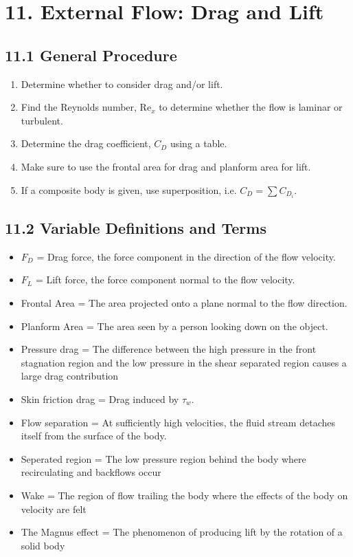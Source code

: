 \section*{11. External Flow: Drag and Lift}
\subsection*{11.1 General Procedure}
\begin{enumerate}
    \item Determine whether to consider drag and/or lift.
    \item Find the Reynolds number, Re$_x$ to determine whether the flow is laminar or turbulent.
    \item Determine the drag coefficient, $C_D$ using a table.
    \item Make sure to use the frontal area for drag and planform area for lift.
    \item If a composite body is given, use superposition, i.e. $C_D = \sum C_{D_i}$.
\end{enumerate}

\subsection*{11.2 Variable Definitions and Terms}
\begin{itemize}
    \item $F_D$ = Drag force, the force component in the direction of the flow velocity.
    \item $F_L$ = Lift force, the force component normal to the flow velocity.
    \item Frontal Area = The area projected onto a plane normal to the flow direction.
    \item Planform Area = The area seen by a person looking down on the object.
    \item Pressure drag = The difference between the high pressure in the front stagnation region and the 
    low pressure in the shear separated region causes a large drag contribution
    \item Skin friction drag = Drag induced by $\tau_w$.
    \item Flow separation = At sufficiently high velocities, the fluid stream detaches itself from the 
    surface of the body.
    \item Seperated region = The low pressure region behind the body where recirculating and backflows occur
    \item Wake = The region of flow trailing the body where the effects of the body on velocity are felt
    \item The Magnus effect = The phenomenon of producing lift by the rotation of a solid body
\end{itemize}

